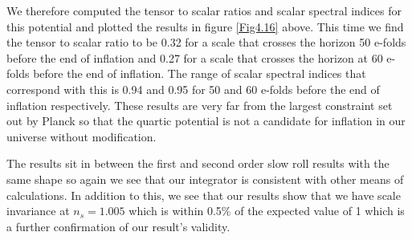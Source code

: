\documentclass[a4paper,12pt,twoside]{report}
\begin{document}
\noindent%
\begin{minipage}{\linewidth}%
\label{Fig4.16}
\end{minipage}

We therefore computed the tensor to scalar ratios and scalar spectral indices for this potential and plotted the results in figure \ref{Fig4.16} above. This time we find the tensor to scalar ratio to be 0.32 for a scale that crosses the horizon 50 e-folds before the end of inflation and 0.27 for a scale that crosses the horizon at 60 e-folds before the end of inflation. The range of scalar spectral indices that correspond with this is 0.94 and 0.95 for 50 and 60 e-folds before the end of inflation respectively. These results are very far from the largest constraint set out by Planck so that the quartic potential is not a candidate for inflation in our universe without modification. 

The results sit in between the first and second order slow roll results with the same shape so again we see that our integrator is consistent with other means of calculations. In addition to this, we see that our results show that we have scale invariance at $n_{s} = 1.005$ which is within 0.5\% of the expected value of 1 which is a further confirmation of our result's validity.
\end{document}
